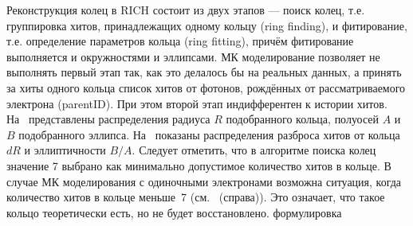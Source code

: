 Реконструкция колец в RICH состоит из двух этапов --- поиск колец, т.е. группировка хитов, принадлежащих одному кольцу (ring finding), и фитирование, т.е. определение параметров кольца (ring fitting), причём фитирование выполняется и окружностями и эллипсами.
МК моделирование позволяет не выполнять первый этап так, как это делалось бы на реальных данных, а принять за хиты одного кольца список хитов от фотонов, рождённых от рассматриваемого электрона (\todo parentID).
При этом второй этап индифферентен к истории хитов.
На~ представлены распределения радиуса $R$ подобранного кольца, полуосей $A$ и $B$ подобранного эллипса. На~ показаны распределения разброса хитов от кольца $dR$ и эллиптичности $B/A$.
Следует отметить, что в алгоритме поиска колец значение 7 выбрано как минимально допустимое количество хитов в кольце.
В случае МК моделирования с одиночными электронами возможна ситуация, когда количество хитов в кольце меньше~7 (см.~ (справа)). Это означает, что такое кольцо теоретически есть, но не будет восстановлено. \todo формулировка


